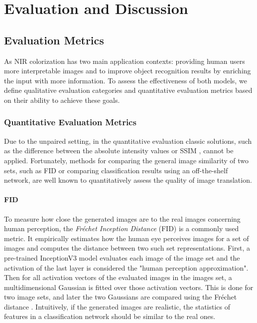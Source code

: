 \chapter{Evaluation and Discussion}
\label{chap:evaluation-and-discussion}

\section{Evaluation Metrics}

As NIR colorization has two main application contexts: providing human users more interpretable images and to improve object recognition results by enriching the input with more information.
To assess the effectiveness of both models, we define qualitative evaluation categories and quantitative evaluation metrics based on their ability to achieve these goals.

\subsection{Quantitative Evaluation Metrics}
Due to the unpaired setting, in the quantitative evaluation classic solutions, such as the difference between the absolute intensity values or SSIM \parencite{ssim}, cannot be applied. Fortunately, methods for comparing the general image similarity of two sets, such as FID \parencite{ttur} or
comparing classification results using an off-the-shelf network, are well known to quantitatively assess the quality of image translation.

\subsubsection*{FID}
To measure how close the generated images are to the real images concerning human perception, the \textit{Fréchet Inception Distance} (FID) \parencite{ttur} is a commonly used metric.
It empirically estimates how the human eye perceives images for a set of images and computes the distance between two such set representations.
First, a pre-trained InceptionV3 model evaluates each image of the image set and the activation of the last layer is considered the "human perception approximation".
Then for all activation vectors of the evaluated images in the images set, a multidimensional Gaussian is fitted over those activation vectors.
This is done for two image sets, and later the two Gaussians are compared using the Fréchet distance \parencite{ttur}.
Intuitively, if the generated images are realistic, the statistics of features in a classification network should be similar to the real ones.

